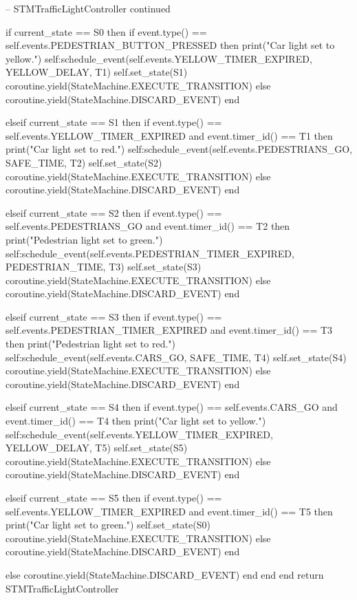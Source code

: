 \begin{appendices}
\begin{listing}[htp]
\begin{luacode}
-- STMTrafficLightController continued

	if current_state == S0 then
			if event.type() == self.events.PEDESTRIAN_BUTTON_PRESSED then
				print("Car light set to yellow.")
				self:schedule_event(self.events.YELLOW_TIMER_EXPIRED, YELLOW_DELAY, T1)
				self.set_state(S1)
				coroutine.yield(StateMachine.EXECUTE_TRANSITION)
			else
				coroutine.yield(StateMachine.DISCARD_EVENT)
			end

	elseif current_state == S1 then
			if event.type() == self.events.YELLOW_TIMER_EXPIRED
			     and event.timer_id() == T1 then
				print("Car light set to red.")
				self:schedule_event(self.events.PEDESTRIANS_GO, SAFE_TIME, T2)
				self.set_state(S2)
				coroutine.yield(StateMachine.EXECUTE_TRANSITION)
			else
				coroutine.yield(StateMachine.DISCARD_EVENT)
			end

		elseif current_state == S2 then
			if event.type() == self.events.PEDESTRIANS_GO
			     and event.timer_id() == T2 then
				print("Pedestrian light set to green.")
				self:schedule_event(self.events.PEDESTRIAN_TIMER_EXPIRED, PEDESTRIAN_TIME, T3)
				self.set_state(S3)
				coroutine.yield(StateMachine.EXECUTE_TRANSITION)
			else
				coroutine.yield(StateMachine.DISCARD_EVENT)
			end

		elseif current_state == S3 then
			if event.type() == self.events.PEDESTRIAN_TIMER_EXPIRED
			     and event.timer_id() == T3 then
				print("Pedestrian light set to red.")
				self:schedule_event(self.events.CARS_GO, SAFE_TIME, T4)
				self.set_state(S4)
				coroutine.yield(StateMachine.EXECUTE_TRANSITION)
			else
				coroutine.yield(StateMachine.DISCARD_EVENT)
			end

		elseif current_state == S4 then
			if event.type() == self.events.CARS_GO
			     and event.timer_id() == T4 then
				print("Car light set to yellow.")
				self:schedule_event(self.events.YELLOW_TIMER_EXPIRED, YELLOW_DELAY, T5)
				self.set_state(S5)
				coroutine.yield(StateMachine.EXECUTE_TRANSITION)
			else
				coroutine.yield(StateMachine.DISCARD_EVENT)
			end

		elseif current_state == S5 then
			if event.type() == self.events.YELLOW_TIMER_EXPIRED
			     and event.timer_id() == T5 then
				print("Car light set to green.")
				self.set_state(S0)
				coroutine.yield(StateMachine.EXECUTE_TRANSITION)
			else
				coroutine.yield(StateMachine.DISCARD_EVENT)
			end

		else
			coroutine.yield(StateMachine.DISCARD_EVENT)
		end
	end
end
return STMTrafficLightController		
\end{luacode}
\end{listing}


\end{appendices}
